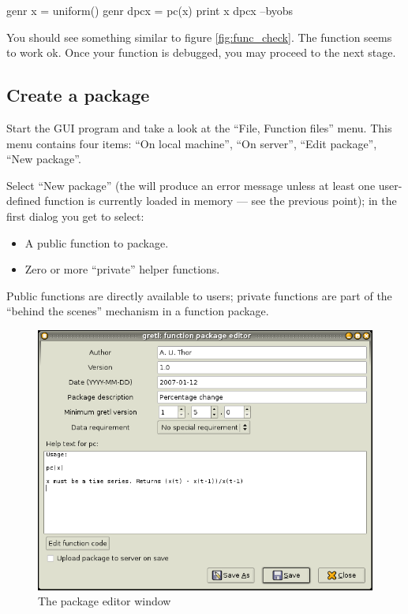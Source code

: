\begin{code}
genr x = uniform()
genr dpcx = pc(x)
print x dpcx --byobs
\end{code}

You should see something similar to figure \ref{fig:func_check}. The
function seems to work ok. Once your function is debugged, you
may proceed to the next stage.

\subsection{Create a package}

Start the GUI program and take a look at the ``File, Function files'' menu.
This menu contains four items: ``On local machine'', ``On server'', ``Edit
package'', ``New package''.

Select ``New package'' (the will produce an error message unless at
least one user-defined function is currently loaded in memory --- see
the previous point); in the first dialog you get to select:

\begin{itemize}
\item A public function to package.
\item Zero or more ``private'' helper functions.
\end{itemize}

Public functions are directly available to users; private functions are
part of the ``behind the scenes'' mechanism in a function package.

\begin{figure}[htbp]
  \centering
  \includegraphics[scale=0.5]{figures/package_editor}
  \caption{The package editor window}
  \label{fig:package_editor}
\end{figure}

